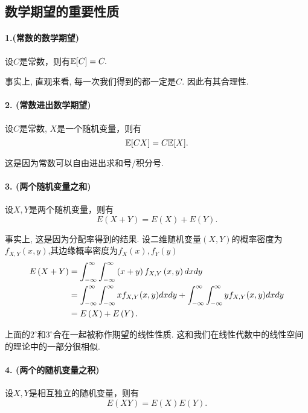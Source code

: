     \subsection{数学期望的重要性质}
    
    \paragraph{1.(常数的数学期望)} 设$C$是常数，则有$\mathbb E[C] = C.$

    事实上, 直观来看, 每一次我们得到的都一定是$C$. 因此有其合理性. 

    \paragraph{2. (常数进出数学期望)} 设$C$是常数, $X$是一个随机变量，则有
    \[
        \mathbb E[CX] = C\mathbb E[X].
    \]
    
    这是因为常数可以自由进出求和号/积分号. 

    \paragraph{3. (两个随机变量之和)}设$X,Y$是两个随机变量，则有
    \[
        E\left(X+Y\right) = E\left(X\right) + E\left(Y\right).
    \]

    事实上, 这是因为分配率得到的结果. 设二维随机变量$\left(X,Y\right)$的概率密度为$f_{X,Y}\left(x,y\right)$,其边缘概率密度为$f_X(x),f_Y(y)$
    \begin{align}
        E\left(X+Y\right) &= \int_{-\infty}^{\infty}\int_{-\infty}^{\infty}\left(x+y\right)f_{X,Y}\left(x,y\right){d}x{d}y \notag\\
        & =  \int_{-\infty}^{\infty}\int_{-\infty}^{\infty}xf_{X,Y}(x,y){d}x{d}y + \int_{-\infty}^{\infty}\int_{-\infty}^{\infty}yf_{X,Y}(x,y){d}x{d}y \notag\\
        & = E\left(X\right) + E\left(Y\right)\notag.
    \end{align}

    上面的$2^\circ$和$3^\circ$合在一起被称作期望的线性性质. 这和我们在线性代数中的线性空间的理论中的一部分很相似. 

    \paragraph{4. (两个的随机变量之积)} 设$X,Y$是相互独立的随机变量，则有\[
        E\left(XY\right) = E\left(X\right)E\left(Y\right).
    \]



